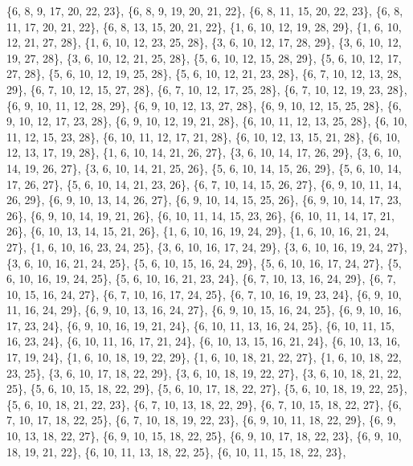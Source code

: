 \documentclass[11pt,a4paper]{article}
\begin{document}
{\{6, 8, 9, 17, 20, 22, 23\}, \{6, 8, 9, 19, 20, 21, 22\}, \{6, 8, 11, 15, 20, 22, 23\}, \{6, 8, 11, 17, 20, 21, 22\}, \{6, 8, 13, 15, 20, 21, 22\},
\{1, 6, 10, 12, 19, 28, 29\}, \{1, 6, 10, 12, 21, 27, 28\}, \{1, 6, 10, 12, 23, 25, 28\}, \{3, 6, 10, 12, 17, 28, 29\}, \{3, 6, 10, 12, 19, 27, 28\},
\{3, 6, 10, 12, 21, 25, 28\}, \{5, 6, 10, 12, 15, 28, 29\}, \{5, 6, 10, 12, 17, 27, 28\}, \{5, 6, 10, 12, 19, 25, 28\}, \{5, 6, 10, 12, 21, 23, 28\},
\{6, 7, 10, 12, 13, 28, 29\}, \{6, 7, 10, 12, 15, 27, 28\}, \{6, 7, 10, 12, 17, 25, 28\}, \{6, 7, 10, 12, 19, 23, 28\}, \{6, 9, 10, 11, 12, 28, 29\},
\{6, 9, 10, 12, 13, 27, 28\}, \{6, 9, 10, 12, 15, 25, 28\}, \{6, 9, 10, 12, 17, 23, 28\}, \{6, 9, 10, 12, 19, 21, 28\}, \{6, 10, 11, 12, 13, 25, 28\},
\{6, 10, 11, 12, 15, 23, 28\}, \{6, 10, 11, 12, 17, 21, 28\}, \{6, 10, 12, 13, 15, 21, 28\}, \{6, 10, 12, 13, 17, 19, 28\}, \{1, 6, 10, 14, 21, 26, 27\},
\{3, 6, 10, 14, 17, 26, 29\}, \{3, 6, 10, 14, 19, 26, 27\}, \{3, 6, 10, 14, 21, 25, 26\}, \{5, 6, 10, 14, 15, 26, 29\}, \{5, 6, 10, 14, 17, 26, 27\},
\{5, 6, 10, 14, 21, 23, 26\}, \{6, 7, 10, 14, 15, 26, 27\}, \{6, 9, 10, 11, 14, 26, 29\}, \{6, 9, 10, 13, 14, 26, 27\}, \{6, 9, 10, 14, 15, 25, 26\},
\{6, 9, 10, 14, 17, 23, 26\}, \{6, 9, 10, 14, 19, 21, 26\}, \{6, 10, 11, 14, 15, 23, 26\}, \{6, 10, 11, 14, 17, 21, 26\}, \{6, 10, 13, 14, 15, 21, 26\},
\{1, 6, 10, 16, 19, 24, 29\}, \{1, 6, 10, 16, 21, 24, 27\}, \{1, 6, 10, 16, 23, 24, 25\}, \{3, 6, 10, 16, 17, 24, 29\}, \{3, 6, 10, 16, 19, 24, 27\},
\{3, 6, 10, 16, 21, 24, 25\}, \{5, 6, 10, 15, 16, 24, 29\}, \{5, 6, 10, 16, 17, 24, 27\}, \{5, 6, 10, 16, 19, 24, 25\}, \{5, 6, 10, 16, 21, 23, 24\},
\{6, 7, 10, 13, 16, 24, 29\}, \{6, 7, 10, 15, 16, 24, 27\}, \{6, 7, 10, 16, 17, 24, 25\}, \{6, 7, 10, 16, 19, 23, 24\}, \{6, 9, 10, 11, 16, 24, 29\},
\{6, 9, 10, 13, 16, 24, 27\}, \{6, 9, 10, 15, 16, 24, 25\}, \{6, 9, 10, 16, 17, 23, 24\}, \{6, 9, 10, 16, 19, 21, 24\}, \{6, 10, 11, 13, 16, 24, 25\},
\{6, 10, 11, 15, 16, 23, 24\}, \{6, 10, 11, 16, 17, 21, 24\}, \{6, 10, 13, 15, 16, 21, 24\}, \{6, 10, 13, 16, 17, 19, 24\}, \{1, 6, 10, 18, 19, 22, 29\},
\{1, 6, 10, 18, 21, 22, 27\}, \{1, 6, 10, 18, 22, 23, 25\}, \{3, 6, 10, 17, 18, 22, 29\}, \{3, 6, 10, 18, 19, 22, 27\}, \{3, 6, 10, 18, 21, 22, 25\},
\{5, 6, 10, 15, 18, 22, 29\}, \{5, 6, 10, 17, 18, 22, 27\}, \{5, 6, 10, 18, 19, 22, 25\}, \{5, 6, 10, 18, 21, 22, 23\}, \{6, 7, 10, 13, 18, 22, 29\},
\{6, 7, 10, 15, 18, 22, 27\}, \{6, 7, 10, 17, 18, 22, 25\}, \{6, 7, 10, 18, 19, 22, 23\}, \{6, 9, 10, 11, 18, 22, 29\}, \{6, 9, 10, 13, 18, 22, 27\},
\{6, 9, 10, 15, 18, 22, 25\}, \{6, 9, 10, 17, 18, 22, 23\}, \{6, 9, 10, 18, 19, 21, 22\}, \{6, 10, 11, 13, 18, 22, 25\}, \{6, 10, 11, 15, 18, 22, 23\},
}
\end{document}
